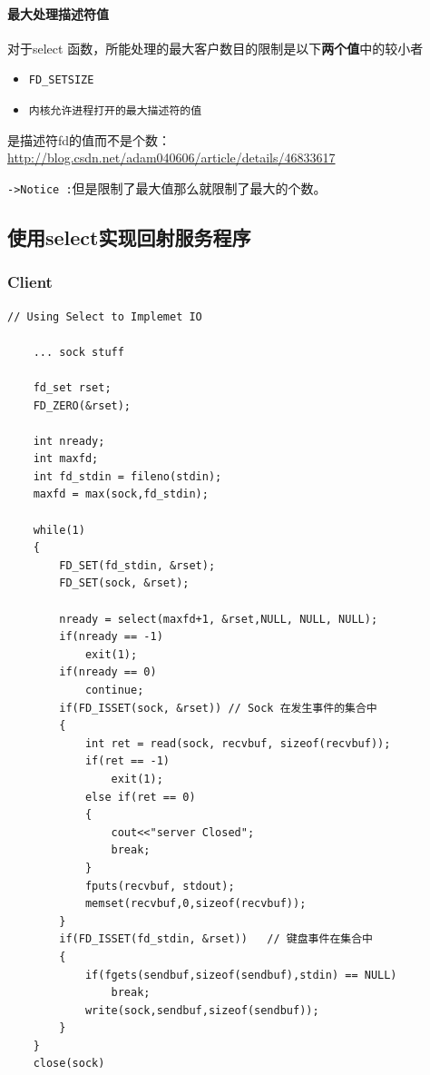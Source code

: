 \documentclass[UTF8,a4paper,8pt]{ctexbook}
\begin{document}
			\paragraph{最大处理描述符值}
				对于select 函数，所能处理的最大客户数目的限制是以下\textbf{两个值}中的较小者
					\begin{itemize}
						\item \verb|FD_SETSIZE|
						\item \verb|内核允许进程打开的最大描述符的值|
					\end{itemize}	
					
				是描述符fd的值而不是个数：\url{http://blog.csdn.net/adam040606/article/details/46833617}
				
				\verb|->Notice :|但是限制了最大值那么就限制了最大的个数。
		\subsection{使用select实现回射服务程序}
			\subsubsection{Client}
				\begin{lstlisting}
// Using Select to Implemet IO
	
	... sock stuff
	
	fd_set rset;
	FD_ZERO(&rset);
	
	int nready;
	int maxfd;
	int fd_stdin = fileno(stdin);
	maxfd = max(sock,fd_stdin);
	
	while(1)
	{
		FD_SET(fd_stdin, &rset);
		FD_SET(sock, &rset);
		
		nready = select(maxfd+1, &rset,NULL, NULL, NULL);
		if(nready == -1)
			exit(1);
		if(nready == 0)
			continue;
		if(FD_ISSET(sock, &rset)) // Sock 在发生事件的集合中
		{
			int ret = read(sock, recvbuf, sizeof(recvbuf));
			if(ret == -1)
				exit(1);
			else if(ret == 0)
			{
				cout<<"server Closed";
				break;
			}
			fputs(recvbuf, stdout);
			memset(recvbuf,0,sizeof(recvbuf));
		}
		if(FD_ISSET(fd_stdin, &rset))	// 键盘事件在集合中
		{
			if(fgets(sendbuf,sizeof(sendbuf),stdin) == NULL)
				break;
			write(sock,sendbuf,sizeof(sendbuf));
		}
	}
	close(sock)

				\end{lstlisting}
\end{document}
